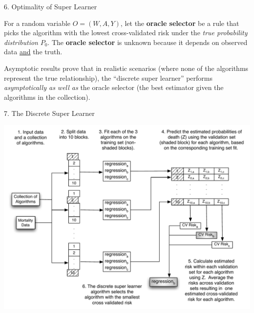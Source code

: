 \documentclass[12pt,t]{beamer}
\begin{document}
\begin{frame}[c]{6. Optimality of Super Learner}

\vspace*{1mm}

\centering

  For a random variable $O = (W, A, Y)$, let the \textbf{oracle selector} be a
  rule that picks the algorithm with the lowest cross-validated risk under the
  \textit{true probability distribution} $P_{0}$. The \textbf{oracle selector}
  is unknown because it depends on observed data \underline{and} the truth.

\vspace{1em}

  Asymptotic results prove that in realistic scenarios (where none of the
  algorithms represent the true relationship), the ``discrete super learner''
  performs \textit{asymptotically as well as} the oracle selector (the best
  estimator given the algorithms in the collection).

\end{frame}


\begin{frame}[c]{7. The Discrete Super Learner}

\vspace*{3mm}

\centering

\includegraphics[scale=0.45]{Figs/discreteSL.pdf}

\note{
}
\end{frame}
\end{document}
